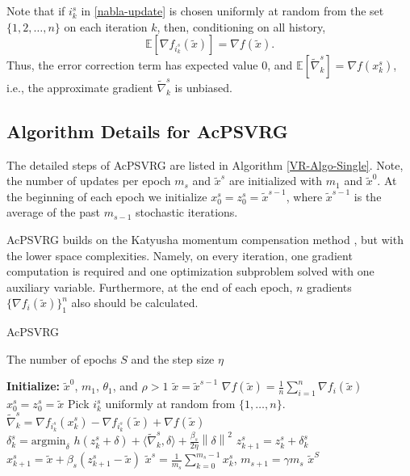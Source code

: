\documentclass[conference]{IEEEtran}
\newcommand*{\E}{\mathbb{E}}
\newcommand{\norm}[1]{\left\lVert#1\right\rVert}
\renewcommand{\algorithmicrequire}{
\textbf{Input:}}
\renewcommand{\algorithmicensure}{\textbf{Output:}}
\theoremstyle{definition}
\theoremstyle{remark}
\begin{document}
Note that if $i_k^s$ in \eqref{nabla-update} is chosen uniformly at random from the set $\{1,2,\ldots,n\}$ on each iteration $k$, then, conditioning on all history,
\[
\E[\nabla f_{i_k^s}(\widetilde{x})] = \nabla f(\widetilde{x}).
\] 
Thus, the error correction term has expected value $0$, and $\E[\widetilde{\nabla}_k^s] = \nabla f(x_{k}^s)$, i.e., the approximate gradient $\widetilde{\nabla}_k^s$ is unbiased.

\subsection{Algorithm Details for AcPSVRG}
The detailed steps of AcPSVRG are listed in Algorithm \ref{VR-Algo-Single}. Note, the number of updates per epoch $m_s$ and $\widetilde{x}^s$ are initialized with $m_1$ and $\widetilde{x}^0$. At the beginning of each epoch we initialize $x_0^s=z_0^s=\widetilde{x}^{s-1}$, where $\widetilde{x}^{s-1}$ is the average of the past $m_{s-1}$ stochastic iterations.

AcPSVRG builds on the Katyusha momentum compensation method \cite{Allen-Zhu17}, but with the lower space complexities. Namely, on every iteration, one gradient computation is required and one optimization subproblem solved with one auxiliary variable. Furthermore, at the end of each epoch, $n$ gradients $\{\nabla f_i (\widetilde{x})\}_{1}^{n}$ also should be calculated.

\begin{algorithm}[H]
\caption{AcPSVRG}\label{VR-Algo-Single}
\begin{algorithmic}
 \renewcommand{\algorithmicrequire}{\textbf{Input:}}
 \renewcommand{\algorithmicensure}{\textbf{Output:}}
  \newcommand{\INITIALIZE}{\item[\textbf{Initialize:}]}
\REQUIRE The number of epochs $S$ and the step size $\eta$
\INITIALIZE $\widetilde{x}^0$, $m_1$, $\theta_1$, and $\rho > 1$
\STATE $\widetilde{x} = \widetilde{x}^{s-1}$
\STATE  $\nabla f(\widetilde{x}) = \frac{1}{n}\sum_{i=1}^n\nabla f_i(\widetilde{x})$
 \STATE $x_0^s = z_0^s = \widetilde{x}$
 \STATE Pick $i_k^s$ uniformly at random from $\{1,\ldots,n\}$.
 \STATE $\widetilde{\nabla}_k^s = \nabla f_{i_k^s}(x_{k}^s) - \nabla f_{i_k^s}(\widetilde{x}) + \nabla f(\widetilde{x})$
 \STATE $\delta_k^s = \text{argmin}_{\delta}\,\,h(z_k^s+\delta)+\langle\widetilde{\nabla}_k^s,\delta\rangle + \frac{{\beta_s}}{2\eta}\norm{\delta}^2$
 \STATE $z_{k+1}^s = z_{k}^s + \delta_k^s$
 \STATE $x_{k+1}^s = \widetilde{x}+\beta_s(z_{k+1}^s-\widetilde{x})$
 \ENDFOR
\STATE $\widetilde{x}^s = \frac{1}{m_s}\sum_{k=0}^{m_s-1} x_{k}^s$, $m_{s+1} = \gamma m_s$
 \ENDFOR
 \ENSURE $\widetilde{x}^S$
\end{algorithmic}
\end{algorithm}
\end{document}
